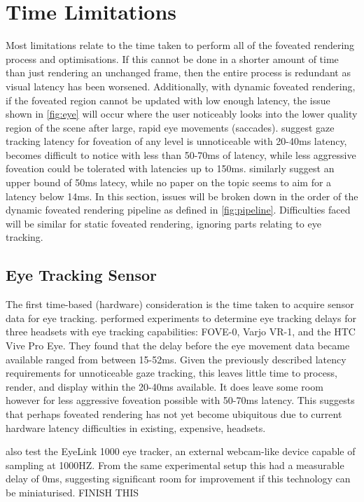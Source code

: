 \documentclass[a4paper,11pt]{article}
\begin{document}
\section{Time Limitations}
Most limitations relate to the time taken to perform all of the foveated rendering process and optimisations. If this cannot be done in a shorter amount of time than just rendering an unchanged frame, then the entire process is redundant as visual latency has been worsened. Additionally, with dynamic foveated rendering, if the foveated region cannot be updated with low enough latency, the issue shown in \cref{fig:eye} will occur where the user noticeably looks into the lower quality region of the scene after large, rapid eye movements (saccades). \textcite{albert2017latency} suggest gaze tracking latency for foveation of any level is unnoticeable with 20-40ms latency, becomes difficult to notice with less than 50-70ms of latency, while less aggressive foveation could be tolerated with latencies up to 150ms. \textcite{li2020optical} similarly suggest an upper bound of 50ms latecy, while no paper on the topic seems to aim for a latency below 14ms\cite{koskela2018instantaneous}. In this section, issues will be broken down in the order of the dynamic foveated rendering pipeline as defined in \cref{fig:pipeline}. Difficulties faced will be similar for static foveated rendering, ignoring parts relating to eye tracking.
\subsection{Eye Tracking Sensor}
The first time-based (hardware) consideration is the time taken to acquire sensor data for eye tracking. \textcite{stein2021comparison} performed experiments to determine eye tracking delays for three headsets with eye tracking capabilities: FOVE-0, Varjo VR-1, and the HTC Vive Pro Eye. They found that the delay before the eye movement data became available ranged from between 15-52ms. Given the previously described latency requirements for unnoticeable gaze tracking, this leaves little time to process, render, and display within the 20-40ms available. It does leave some room however for less aggressive foveation possible with 50-70ms latency. This suggests that perhaps foveated rendering has not yet become ubiquitous due to current hardware latency difficulties in existing, expensive, headsets.

\textcite{stein2021comparison} also test the EyeLink 1000 eye tracker, an external webcam-like device capable of sampling at 1000HZ. From the same experimental setup this had a measurable delay of 0ms, suggesting significant room for improvement if this technology can be miniaturised. FINISH THIS
\end{document}
